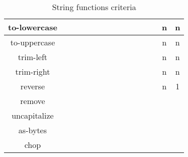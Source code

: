 \documentclass[anonymous,sigplan,review,11pt,nonacm,natbib=false]{acmart}
\begin{document}
\begin{table*}[]
\begin{tabular}{|c||c|c|c|c|c|c|c|c|c|c|c|c|c|c|}
            to-lowercase &  &  &  &  &  &  &  &  &  &  &  &  & n & n \\ \hline

            to-uppercase &  &  &  &  &  &  &  &  &  &  &  &  & n & n \\ \hline

            trim-left &  &  &  &  &  &  &  &  &  &  &  &  & n & n \\ \hline

            trim-right &  &  &  &  &  &  &  &  &  &  &  &  & n & n \\ \hline

            reverse &  &  &  &  &  &  &  &  &  &  &  &  & n & 1 \\ \hline

            remove &  &  &  &  &  &  &  &  &  &  &  &  &  & \\ \hline

            uncapitalize &  &  &  &  &  &  &  &  &  &  &  &  &  & \\ \hline

            as-bytes &  &  &  &  &  &  &  &  &  &  &  &  &  & \\ \hline

            chop &  &  &  &  &  &  &  &  &  &  &  &  &  & \\ \hline


        \end{tabular}
        \caption{String functions criteria}
        \label{tab:my_label}
    \end{table*}

    \printbibliography
\end{document}
